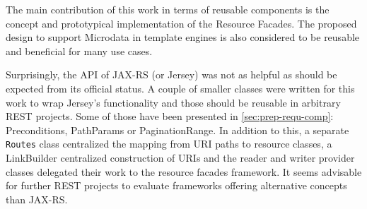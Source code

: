 \documentclass[11pt,a4paper,headsepline,twoside]{scrartcl}		%
\begin{document}
The main contribution of this work in terms of reusable components is the
concept and prototypical implementation of the Resource Facades. The proposed
design to support Microdata in template engines is also considered to be
reusable and beneficial for many use cases.


Surprisingly, the API of JAX-RS (or Jersey) was not as helpful as should be
expected from its official status. A couple of smaller classes were written for
this work to wrap Jersey's functionality and those should be reusable in
arbitrary REST projects. Some of those have been presented in
\autoref{sec:prep-requ-comp}: Preconditions, PathParams or PaginationRange. In
addition to this, a separate \lstinline:Routes: class centralized the mapping
from URI paths to resource classes, a LinkBuilder centralized construction of
URIs and the reader and writer provider classes delegated their work to the
resource facades framework. It seems advisable for further REST projects to
evaluate frameworks offering alternative concepts than JAX-RS.




\end{document}
